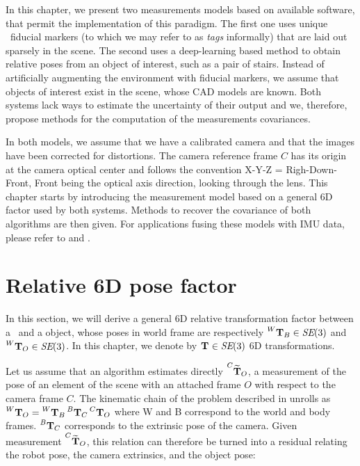 In this chapter, we present two measurements models based on available software, that permit the implementation of this paradigm. The first one 
uses unique \apriltag\ fiducial markers \cite{wang2016iros} (to which we may refer to as \textit{tags} informally) that are laid out sparsely in the scene. 
The second uses a deep-learning based method \cite{labbe2020cosypose}
to obtain relative poses from an object of interest, such as a pair of stairs. Instead of artificially augmenting the environment with fiducial markers, we assume 
that objects of interest exist in the scene, whose CAD models are known. 
Both systems lack ways to estimate the uncertainty of their output and we, therefore, propose methods for the computation of the measurements covariances.

In both models, we assume that we have a calibrated camera and that the images have been corrected for distortions. The camera reference frame $C$ has its origin at 
the camera optical center and follows the convention X-Y-Z = Righ-Down-Front, Front being the optical axis direction, looking through the lens. This chapter starts by 
introducing the measurement model based on a general 6D factor used by both systems. Methods to recover the covariance of both algorithms are then given. 
For applications fusing these models with IMU data, please refer to  and .



\section{Relative 6D pose factor}
In this section, we will derive a general 6D relative transformation factor between a \keyframe\ and a object, whose poses in world frame are respectively $\prescript{W}{}{{\bf T}}_{B} \in \textit{SE}(3)$ and $\prescript{W}{}{{\bf T}}_{O} \in \textit{SE}(3)$. In this chapter, we denote by $\prescript{}{}{{\bf T}}_{} \in \textit{SE}(3)$ 6D transformations.

Let us assume that an algorithm estimates directly $\prescript{C}{}{\widetilde{{\bf T}}}_{O}$, a measurement of the pose of an element 
of the scene with an attached frame $O$ with respect to the camera frame $C$.
The kinematic chain of the problem described in  unrolls as 
$\prescript{W}{}{{\bf T}}_{O} = \prescript{W}{}{{\bf T}}_{B}\prescript{B}{}{{\bf T}}_{C}\prescript{C}{}{{\bf T}}_{O}$ where W and B correspond to the world and body frames. $\prescript{B}{}{{\bf T}}_{C}$ corresponds to the extrinsic pose 
of the camera.
Given measurement $\prescript{C}{}{\widetilde{{\bf T}}}_{O}$, this relation can therefore be turned into a residual relating 
the robot pose, the camera extrinsics, and the object pose:


